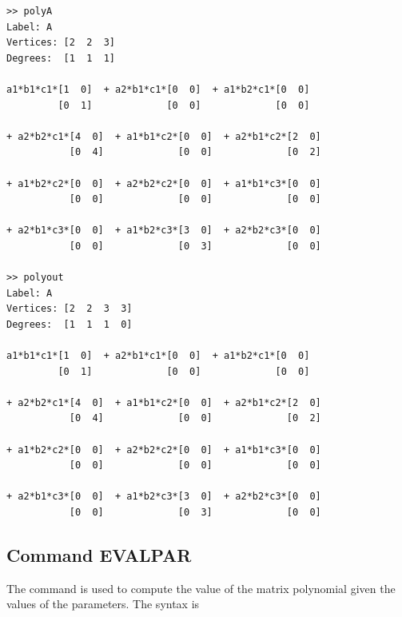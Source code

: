 \documentclass[english,11pt]{article}
\theoremstyle{break} \theorembodyfont{\small\rm}
\begin{document}
\begin{minipage}{13.5cm}
\begin{lstlisting}[rulecolor=\color{red}]
>> polyA
Label: A
Vertices: [2  2  3]
Degrees:  [1  1  1]
 
a1*b1*c1*[1  0]  + a2*b1*c1*[0  0]  + a1*b2*c1*[0  0]  
         [0  1]             [0  0]             [0  0]  
         
+ a2*b2*c1*[4  0]  + a1*b1*c2*[0  0]  + a2*b1*c2*[2  0]           
           [0  4]             [0  0]             [0  2]           
         
+ a1*b2*c2*[0  0]  + a2*b2*c2*[0  0]  + a1*b1*c3*[0  0]            
           [0  0]             [0  0]             [0  0]            
         
+ a2*b1*c3*[0  0]  + a1*b2*c3*[3  0]  + a2*b2*c3*[0  0]         
           [0  0]             [0  3]             [0  0]         
         
>> polyout   
Label: A
Vertices: [2  2  3  3]
Degrees:  [1  1  1  0]
 
a1*b1*c1*[1  0]  + a2*b1*c1*[0  0]  + a1*b2*c1*[0  0]  
         [0  1]             [0  0]             [0  0]  
         
+ a2*b2*c1*[4  0]  + a1*b1*c2*[0  0]  + a2*b1*c2*[2  0]         
           [0  4]             [0  0]             [0  2]         
         
+ a1*b2*c2*[0  0]  + a2*b2*c2*[0  0]  + a1*b1*c3*[0  0]         
           [0  0]             [0  0]             [0  0]         
         
+ a2*b1*c3*[0  0]  + a1*b2*c3*[3  0]  + a2*b2*c3*[0  0]              
           [0  0]             [0  3]             [0  0]              
\end{lstlisting}
\end{minipage}
\vspace{0.2cm}




\subsection*{Command EVALPAR}

The command  is used to compute the value of the matrix polynomial
given the values of the parameters. The syntax is

\vspace{0.5cm}%
\begin{minipage}{8.5cm}
\end{minipage}
\vspace{0.2cm}
\end{document}
